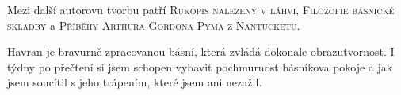 \documentclass[FGBook.tex]{subfiles}
\begin{document}

\noindent Mezi další autorovu tvorbu patří \textsc{Rukopis nalezený v láhvi},
\textsc{Filozofie básnické skladby} a \textsc{Příběhy Arthura Gordona Pyma z Nantucketu}.






\noindent 
Havran je bravurně zpracovanou básní, která zvládá dokonale obrazutvornost. I týdny po přečtení si jsem schopen vybavit pochmurnost básníkova pokoje a jak jsem soucítil s jeho trápením, které jsem ani nezažil.

\newpage
\end{document}
